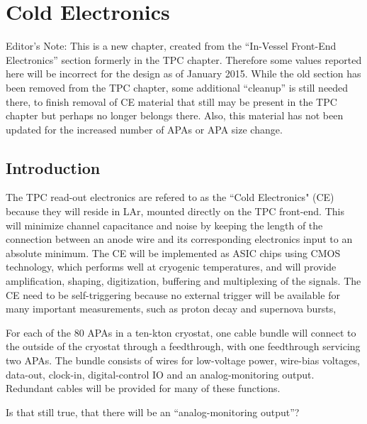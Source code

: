 \chapter{Cold Electronics}
\label{ch:ce}

\begin{editornote}
  Editor's Note:  This is a new chapter, created from the ``In-Vessel Front-End Electronics'' section formerly in the TPC chapter.
Therefore some values reported here will be incorrect for the design as of January 2015. 
While the old section has been removed from the TPC chapter, some additional ``cleanup'' is still needed there,
to finish removal of CE material that still may be present in the TPC chapter but perhaps no longer belongs there.
Also, this material has not been updated for the increased number of APAs or APA size change.
\end{editornote}

\section{Introduction}
\label{sec:ce-intro}

The TPC read-out electronics are refered to as the ``Cold Electronics" (CE) because they will reside in LAr,
mounted directly on the TPC front-end.
This will minimize channel capacitance and noise by keeping the length of the connection between an anode wire
and its corresponding electronics input to an absolute minimum.
The CE will be implemented as ASIC chips using CMOS technology, which performs well at cryogenic temperatures,
and will provide amplification, shaping, digitization, buffering and multiplexing of the signals.
The CE need to be self-triggering because no external trigger will be available for many important measurements,
such as proton decay and supernova bursts,

For each of the 80 APAs in a ten-kton cryostat, one cable bundle will connect to the outside of the cryostat through
a feedthrough, with one feedthrough servicing two APAs.
The bundle consists of wires for low-voltage power, wire-bias voltages, data-out, clock-in,
digital-control IO and an analog-monitoring output.
Redundant cables will be provided for many of these functions.
\begin{editornote}
  Is that still true, that there will be an ``analog-monitoring output''?
\end{editornote}

